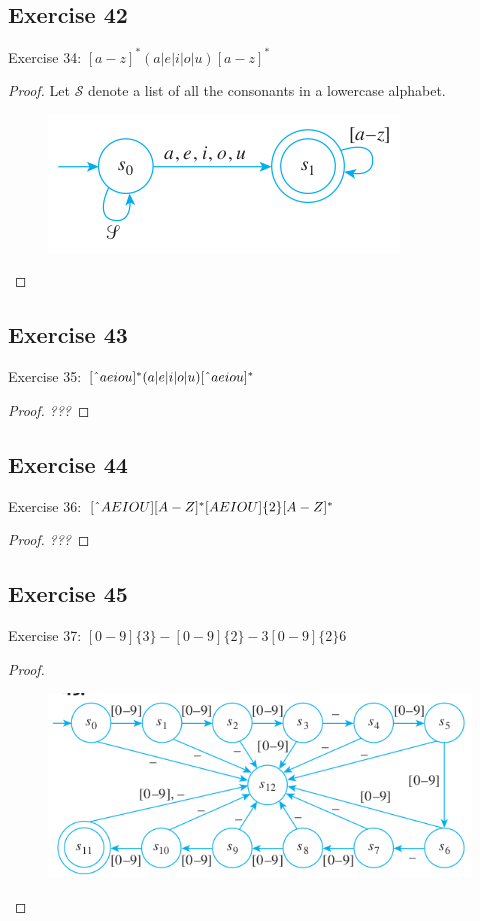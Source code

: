 \documentclass[14pt]{extarticle}
\begin{document}
\subsection{Exercise 42}
Exercise 34: \([a - z]^*(a | e | i | o | u)[a - z]^*\)
\begin{proof}
Let \(\mathscr{S}\) denote a list of all the consonants in a lowercase alphabet.

\begin{figure}[ht!]
\centering
\includegraphics[scale=0.5]{../images/12.2.42.png}
\end{figure}
\end{proof}

\subsection{Exercise 43}
Exercise 35: \([\string^ aeiou]^*(a|e|i|o|u)[\string^ aeiou]^*\)
\begin{proof}
{\it ???}
\end{proof}

\subsection{Exercise 44}
Exercise 36: \([\string^ AEIOU][A-Z]^*[AEIOU]\{2\}[A-Z]^*\)
\begin{proof}
{\it ???}
\end{proof}

\subsection{Exercise 45}
Exercise 37: \([0 - 9]\{3\} - [0 - 9]\{2\} - 3[0 - 9]\{2\}6\)
\begin{proof}
\begin{figure}[ht!]
\centering
\includegraphics[scale=0.5]{../images/12.2.45.png}
\end{figure}
\end{proof}
\end{document}
